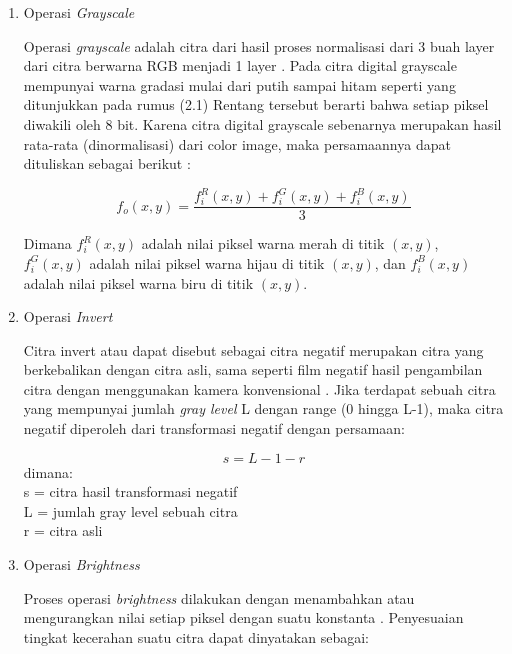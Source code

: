 \begin{enumerate}[leftmargin=1cm, itemindent=0.6cm,labelwidth=15pt, labelsep=5pt, listparindent=1cm,align=left]

	\item Operasi \textit{Grayscale}

Operasi \textit{grayscale} adalah citra dari hasil proses normalisasi dari 3 buah layer dari citra berwarna RGB menjadi 1 layer \cite{suryowinoto2017penggunaan}. Pada citra digital grayscale mempunyai warna gradasi mulai dari putih sampai hitam seperti yang ditunjukkan pada rumus (2.1) Rentang tersebut berarti bahwa setiap piksel diwakili oleh 8 bit. Karena citra digital grayscale sebenarnya merupakan hasil rata-rata
(dinormalisasi) dari color image, maka persamaannya dapat dituliskan sebagai berikut :

\begin{equation}
f_o(x,y) = \frac{f_i^R(x,y) + f_i^G(x,y) + f_i^B(x,y)}{3}
\end{equation}

Dimana \(f_i^R(x,y)\) adalah nilai piksel warna merah di titik \((x,y)\), \(f_i^G(x,y) \) adalah nilai piksel warna hijau di titik \((x,y)\), dan \(f_i^B(x,y)\) adalah nilai piksel warna biru di titik \((x,y)\).

	\item Operasi \textit{Invert}

        Citra invert atau dapat disebut sebagai citra negatif merupakan citra yang berkebalikan dengan citra asli, sama seperti film negatif hasil pengambilan citra dengan menggunakan kamera konvensional \cite{mahardika2017implementasi}. Jika terdapat sebuah citra yang mempunyai jumlah \textit{gray level} L dengan range (0 hingga L-1), maka citra negatif diperoleh dari transformasi negatif dengan persamaan:

        \begin{equation}
            s = L - 1 - r
        \end{equation}
dimana:\\
s = citra hasil transformasi negatif\\
L = jumlah gray level sebuah citra\\
r = citra asli

	\item Operasi \textit{Brightness}

        Proses operasi \textit{brightness} dilakukan dengan menambahkan atau mengurangkan nilai setiap piksel dengan suatu konstanta \cite{SPEKTRUM}. Penyesuaian tingkat kecerahan suatu citra dapat dinyatakan
sebagai:


\end{enumerate}
